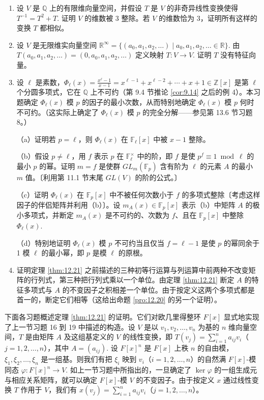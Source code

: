\begin{enumerate}
\item 设 \(V\) 是 \(\mathbb{Q}\) 上的有限维向量空间，并假设 \(T\) 是 \(V\) 的非奇异线性变换使得 \(T^{-1} = T^2+T\). 证明 \(V\) 的维数被 3 整除。若 \(V\) 的维数恰为 3，证明所有这样的变换 \(T\) 都相似。

\item 设 \(V\) 是无限维实向量空间 \(\mathbb{R}^\infty = \{(a_0, a_1, a_2, \ldots) \mid a_0, a_1, a_2, \ldots \in \mathbb{R}\}\). 由 \(T(a_0, a_1, a_2, \ldots) = (0, a_0, a_1, a_2, \ldots)\) 定义映射 \(T : V \to V\). 证明 \(T\) 没有特征向量。

\item 设 \(\ell\) 是素数，\(\Phi_\ell(x) = \frac{x^\ell-1}{x-1} = x^{\ell-1}+x^{\ell-2}+\cdots+x+1 \in \mathbb{Z}[x]\) 是第 \(\ell\) 个分圆多项式，它在 \(\mathbb{Q}\) 上不可约（第 9.4 节推论 \ref{cor:9.14} 之后的例 4）。本习题确定 \(\Phi_\ell(x)\) 模 \(p\) 的因子的最小次数，从而特别地确定 \(\Phi_\ell(x)\) 模 \(p\) 何时不可约。（这实际上确定了 \(\Phi_\ell(x)\) 模 \(p\) 的完全分解——参见第 13.6 节习题 8。）

（a）证明若 \(p = \ell\)，则 \(\Phi_\ell(x)\) 在 \(\mathbb{F}_\ell[x]\) 中被 \(x-1\) 整除。

（b）假设 \(p \neq \ell\)，用 \(f\) 表示 \(p\) 在 \(\mathbb{F}_\ell^\times\) 中的阶，即 \(f\) 是使 \(p^f \equiv 1 \bmod \ell\) 的最小 \(p\) 的幂。证明 \(m = f\) 是使群 \(GL_m(\mathbb{F}_p)\) 含有阶为 \(\ell\) 的元素 \(A\) 的最小 \(m\) 值。〔利用第 11.1 节末尾 \(GL(V)\) 的阶的公式。〕

（c）证明 \(\Phi_\ell(x)\) 在 \(\mathbb{F}_p[x]\) 中不被任何次数小于 \(f\) 的多项式整除〔考虑这样因子的伴侣矩阵并利用（b）〕。设 \(m_A(x) \in \mathbb{F}_p[x]\) 表示（b）中矩阵 \(A\) 的极小多项式，并断定 \(m_A(x)\) 是不可约的、次数为 \(f\)、且在 \(\mathbb{F}_p[x]\) 中整除 \(\Phi_\ell(x)\).

（d）特别地证明 \(\Phi_\ell(x)\) 模 \(p\) 不可约当且仅当 \(f = \ell-1\) 是使 \(p\) 的幂同余于 1 模 \(\ell\) 的最小幂，即 \(p\) 是模 \(\ell\) 的原根。

\item 证明定理 \ref{thm:12.21} 之前描述的三种初等行运算与列运算中前两种不改变矩阵的行列式，第三种把行列式乘以一个单位。由定理 \ref{thm:12.21} 断定 \(A\) 的特征多项式与 \(A\) 的不变因子之积相差一个单位。由于按定义这两个多项式都是首一的，断定它们相等（这给出命题 \ref{pro:12.20} 的另一个证明）。
\end{enumerate}

\noindent 下面各习题概述定理 \ref{thm:12.21} 的证明。它们对欧几里得整环 \(F[x]\) 显式地实现了上一节习题 16 到 19 中描述的构造。设 \(V\) 是以 \(v_1, v_2, \ldots, v_n\) 为基的 \(n\) 维向量空间，\(T\) 是由矩阵 \(A\) 及这组基定义的 \(V\) 的线性变换，即 \(T(v_j) = \sum_{i=1}^n a_{ij}v_i\)（\(j = 1, 2, \ldots, n\)），其中 \(A = (a_{ij})\). 设 \(F[x]^n\) 是 \(F[x]\) 上秩 \(n\) 的自由模，\(\xi_1, \xi_2, \ldots, \xi_n\) 是一组基。则我们有把 \(\xi_i\) 映到 \(v_i\)（\(i = 1, 2, \ldots, n\)）的自然满 \(F[x]\)-模同态 \(\varphi : F[x]^n \to V\). 如上一节习题中所指出的，一旦确定了 \(\ker\varphi\) 的一组生成元与相应关系矩阵，就可以确定 \(F[x]\)-模 \(V\) 的不变因子。由于按定义 \(x\) 通过线性变换 \(T\) 作用于 \(V\)，我们有 \(x(v_j) = \sum_{i=1}^n a_{ij}v_i\)（\(j = 1, 2, \ldots, n\)）。

